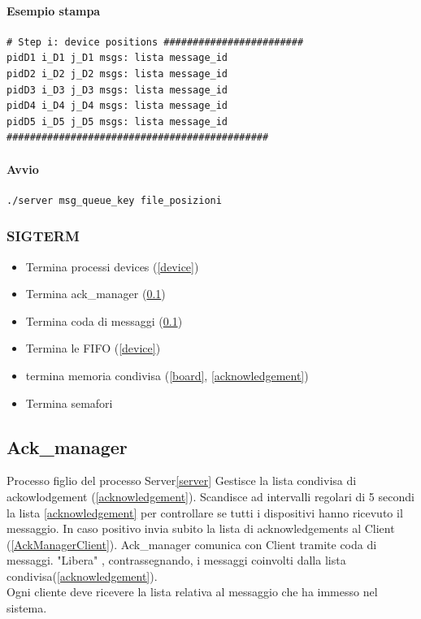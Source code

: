 \documentclass[10pt,a4paper]{article}
\begin{document}
{\paragraph{Esempio stampa}
\begin{verbatim}
# Step i: device positions ########################
pidD1 i_D1 j_D1 msgs: lista message_id
pidD2 i_D2 j_D2 msgs: lista message_id
pidD3 i_D3 j_D3 msgs: lista message_id
pidD4 i_D4 j_D4 msgs: lista message_id
pidD5 i_D5 j_D5 msgs: lista message_id
#############################################
\end{verbatim}
\paragraph{Avvio}
\begin{verbatim}
./server msg_queue_key file_posizioni
\end{verbatim}
\subsubsection{SIGTERM} \label{sigterm}
\begin{itemize}
\item Termina processi devices (\ref{device})
\item Termina ack\_manager (\ref{AckManager})
\item Termina coda di messaggi (\ref{AckManager})
\item Termina le FIFO (\ref{device})
\item termina memoria condivisa (\ref{board}, \ref{acknowledgement})
\item Termina semafori
\end{itemize}

\subsection{Ack\_manager} \label{AckManager}
Processo figlio del processo Server\ref{server} Gestisce la lista condivisa di ackowlodgement (\ref{acknowledgement}). 
Scandisce ad intervalli regolari di 5 secondi la lista  \ref{acknowledgement} per controllare se tutti i dispositivi hanno ricevuto il messaggio.
In caso positivo invia subito la lista di acknowledgements al Client (\ref{AckManagerClient}).
Ack\_manager comunica con Client tramite coda di messaggi.
"Libera" , contrassegnando, i messaggi coinvolti dalla lista condivisa(\ref{acknowledgement}).
\\Ogni cliente deve ricevere la lista relativa al messaggio che ha immesso nel sistema. 
}
\end{document}
